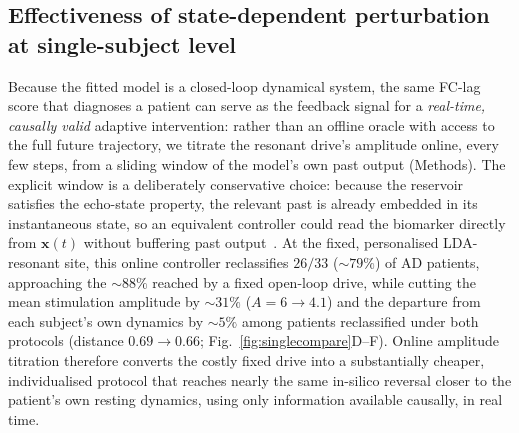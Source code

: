 \documentclass[11pt]{article}
\begin{document}
\subsection*{Effectiveness of state-dependent perturbation at single-subject
level}

Because the fitted model is a closed-loop dynamical system, the same FC-lag score
that diagnoses a patient can serve as the feedback signal for a \emph{real-time,
causally valid} adaptive intervention: rather than an offline oracle with access to
the full future trajectory, we titrate the resonant drive's amplitude online, every
few steps, from a sliding window of the model's own past output (Methods). The
explicit window is a deliberately conservative choice: because the reservoir
satisfies the echo-state property, the relevant past is already embedded in its
instantaneous state, so an equivalent controller could read the biomarker
directly from $\mathbf{x}(t)$ without buffering past
output~\cite{albore2025search}.
At the fixed, personalised LDA-resonant site, this online controller
reclassifies $26/33$ ($\sim$$79\%$) of AD patients, approaching the $\sim$$88\%$ reached
by a fixed open-loop drive, while cutting the mean stimulation amplitude by
$\sim$$31\%$ ($A=6\to4.1$) and the departure from each subject's own dynamics by
$\sim$$5\%$ among patients reclassified under both protocols (distance
$0.69\!\to\!0.66$; Fig.~\ref{fig:singlecompare}D--F). Online amplitude titration
therefore converts the costly fixed drive into a substantially cheaper,
individualised protocol that reaches nearly the same in-silico reversal closer to
the patient's own resting dynamics, using only information available causally, in
real time.
\end{document}

